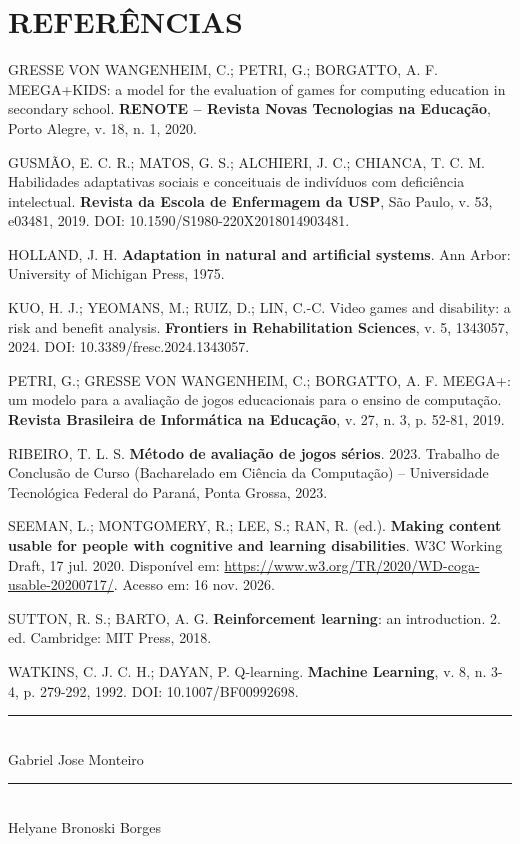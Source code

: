 \documentclass[12pt,a4paper]{article}
\begin{document}
\newpage
\section*{REFERÊNCIAS}
\begingroup
\singlespacing
\setlength{\parindent}{0pt}
\setlength{\parskip}{10pt}

GRESSE VON WANGENHEIM, C.; PETRI, G.; BORGATTO, A. F. MEEGA+KIDS: a model for the evaluation of games for computing education in secondary school. \textbf{RENOTE -- Revista Novas Tecnologias na Educação}, Porto Alegre, v. 18, n. 1, 2020.

GUSMÃO, E. C. R.; MATOS, G. S.; ALCHIERI, J. C.; CHIANCA, T. C. M. Habilidades adaptativas sociais e conceituais de indivíduos com deficiência intelectual. \textbf{Revista da Escola de Enfermagem da USP}, São Paulo, v. 53, e03481, 2019. DOI: 10.1590/S1980-220X2018014903481.

HOLLAND, J. H. \textbf{Adaptation in natural and artificial systems}. Ann Arbor: University of Michigan Press, 1975.

KUO, H. J.; YEOMANS, M.; RUIZ, D.; LIN, C.-C. Video games and disability: a risk and benefit analysis. \textbf{Frontiers in Rehabilitation Sciences}, v. 5, 1343057, 2024. DOI: 10.3389/fresc.2024.1343057.

PETRI, G.; GRESSE VON WANGENHEIM, C.; BORGATTO, A. F. MEEGA+: um modelo para a avaliação de jogos educacionais para o ensino de computação. \textbf{Revista Brasileira de Informática na Educação}, v. 27, n. 3, p. 52-81, 2019.

RIBEIRO, T. L. S. \textbf{Método de avaliação de jogos sérios}. 2023. Trabalho de Conclusão de Curso (Bacharelado em Ciência da Computação) -- Universidade Tecnológica Federal do Paraná, Ponta Grossa, 2023.

SEEMAN, L.; MONTGOMERY, R.; LEE, S.; RAN, R. (ed.). \textbf{Making content usable for people with cognitive and learning disabilities}. W3C Working Draft, 17 jul. 2020. Disponível em: \url{https://www.w3.org/TR/2020/WD-coga-usable-20200717/}. Acesso em: 16 nov. 2026.

SUTTON, R. S.; BARTO, A. G. \textbf{Reinforcement learning}: an introduction. 2. ed. Cambridge: MIT Press, 2018.

WATKINS, C. J. C. H.; DAYAN, P. Q-learning. \textbf{Machine Learning}, v. 8, n. 3-4, p. 279-292, 1992. DOI: 10.1007/BF00992698.

\endgroup

\vspace{3cm}
\begin{center}
\rule{8cm}{0.4pt}\\
Gabriel Jose Monteiro

\vspace{2.5cm}
\rule{8cm}{0.4pt}\\
Helyane Bronoski Borges
\end{center}
\end{document}
